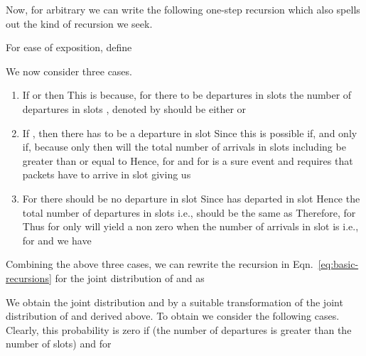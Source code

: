 \documentclass[11pt]{article}
\begin{document}
Now, for arbitrary  we can write the following one-step
recursion which also spells out the kind of recursion we seek. 


{\small

}


\noindent
For ease of exposition, define
{\small

}
\normalsize

\noindent
We now consider three cases.
\begin{enumerate}
\item If  or  then
   This is because, for there to be 
  departures in slots  the number of departures in slots
  , denoted by  should be either  or 

\item If , then there has to be a departure in
  slot  Since  this is possible if, and only if,
   because only then will the total number of
  arrivals in slots  including  be greater than or
  equal to  Hence, for   and for
    is a sure event and
   requires that  packets have to arrive in slot 
  giving us 

\item For  there should be no departure in slot
   Since   has departed in slot  Hence the
  total number of departures in slots  i.e.,  should
  be the same as  Therefore, for 
   Thus for  only  will yield a
  non zero  when the number of arrivals in slot 
  is  i.e., for  and  we have
  
\end{enumerate}
Combining the above three cases, we can rewrite the recursion in
Eqn.~\ref{eq:basic-recursions} for the joint distribution of
 and  as

{\small

}


We obtain the joint distribution  and  by a
suitable transformation of the joint distribution of  and
 derived above. To obtain 
we consider the following cases. Clearly, this probability is zero if
 (the number of departures is greater than the number of slots)
and for 
\end{document}

